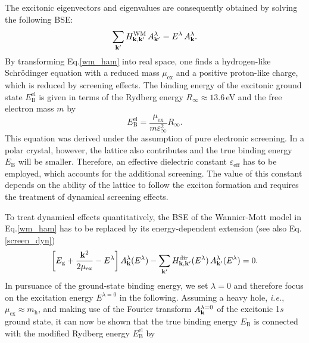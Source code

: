 %
The excitonic eigenvectors and eigenvalues are consequently obtained by solving the following BSE:
%
\begin{equation}
    \sum_\mathbf{k'} H^\text{WM}_\mathbf{k,k'}\,A^\lambda_\mathbf{k'}  =  E^\lambda\,A^\lambda_{\mathbf{k}}.
\end{equation}
%
By transforming Eq.\;\eqref{wm_ham} into real space, one finds a hydrogen-like Schr\"odinger equation with a reduced mass $\mu_\text{ex}$ and a positive proton-like charge, which is reduced 
\newpage
by screening effects.  The binding energy of the excitonic ground state $E^\text{el}_\text{B}$ is given in terms of the Rydberg energy $R_\infty \approx 13.6$\,eV and the free electron mass $m$ by 
%
\begin{equation}\label{wm_rex}
  E^\text{el}_\text{B} = \frac{\mu_\text{ex}}{m\varepsilon_\infty^2}R_\infty.
\end{equation}
%
This equation was derived under the assumption of pure electronic screening.  In a polar crystal, however, the lattice also contributes and the true binding energy $E_\text{B}^{\phantom{l}}$ will be smaller. Therefore, an effective dielectric constant $\varepsilon_\text{eff}$ has to be employed, which accounts for the additional screening. The value of this constant depends on the ability of the lattice to follow the exciton formation and requires the treatment of dynamical screening effects.

To treat dynamical effects quantitatively, the BSE of the Wannier-Mott model in Eq.\;\eqref{wm_ham} has to be replaced by its energy-dependent extension (see also Eq.\;\eqref{screen_dyn})
%
\begin{align}
    \left[E_\text{g} + \frac{\mathbf{k}^2}{2\mu_\text{ex}} - E^\lambda\right]A^\lambda_{\mathbf{k}}(E^\lambda) - \sum_\mathbf{k'}H^\text{dir}_\mathbf{k,k'}(E^\lambda)\,A^\lambda_\mathbf{k'}(E^\lambda) = 0.
\end{align}
%
In pursuance of the ground-state binding energy, we set $ \lambda=0$ and therefore focus on the excitation energy $E^{\lambda=0}$ in the following. Assuming a heavy hole, \textit{i.e.}, $\mu_\text{ex}\approx m_\text{h}$, and making use of the Fourier transform $A^{\lambda=0}_{\mathbf{k}}$ of the excitonic 1$s$ ground state, it can now be shown that the true binding energy $E_\text{B}^{\phantom{l}}$ is connected with the modified Rydberg energy $E^\text{el}_\text{B}$ by 

